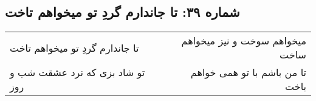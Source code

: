 \begin{center}
\section*{شماره ۳۹: تا جاندارم گردِ تو میخواهم تاخت}
\label{sec:039}
\begin{longtable}{l p{0.5cm} r}
تا جاندارم گردِ تو میخواهم تاخت
&&
میخواهم سوخت و نیز میخواهم ساخت
\\
تو شاد بزی که نرد عشقت شب و روز
&&
تا من باشم با تو همی خواهم باخت
\\
\end{longtable}
\end{center}
